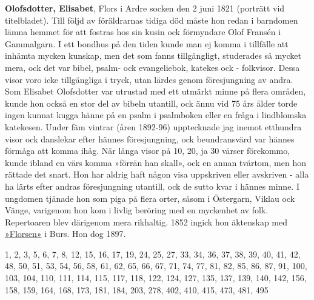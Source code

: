 \textbf{Olofsdotter, Elisabet}, Flors i Ardre socken den 2 juni 1821 (porträtt vid titelbladet).
Till följd av föräldrarnas tidiga död måste hon redan i barndomen lämna hemmet för att fostras hos sin kusin ock förmyndare Olof Fransén i Gammalgarn. I ett bondhus på den tiden kunde man ej komma i tillfälle att inhämta mycken kunskap, men det som fanns tillgängligt, studerades så mycket mera, ock det var bibel, psalm- ock evangeliebok, katekes ock - folkvisor. Dessa visor voro icke tillgängliga i tryck, utan lärdes genom föresjungning av andra. Som Elisabet Olofsdotter var utrustad med ett utmärkt minne på flera områden, kunde hon också en stor del av bibeln utantill, ock ännu vid 75 års ålder torde ingen kunnat kugga hänne på en psalm i psalmboken eller en fråga i lindblomska katekesen. Under fäm vintrar (åren 1892-96) upptecknade jag inemot etthundra visor ock danslekar efter hännes föresjungning, ock beundransvärd var hännes förmåga att komma ihåg. När långa visor på 10, 20, ja 30 värser förekommo, kunde ibland en värs komma »förrän han skall», ock en annan tvärtom, men hon rättade det snart. Hon har aldrig haft någon visa uppskriven eller avskriven - alla ha lärts efter andras föresjungning utantill, ock de sutto kvar i hännes minne. I ungdomen tjänade hon som piga på flera orter, såsom i Östergarn, Viklau ock Vänge, varigenom hon kom i livlig beröring med en myckenhet av folk. Repertoaren blev därigenom mera rikhaltig. 1852 ingick hon äktenskap med \href{Florsen}{»Florsen»} i Burs. Hon dog 1897. 

1, 2, 3, 5, 6, 7, 8, 12, 15, 16, 17, 19, 24, 25, 27, 33, 34, 36, 37, 38, 39, 40, 41, 42, 48, 50, 51, 53, 54, 56, 58, 61, 62, 65, 66, 67, 71, 74, 77, 81, 82, 85, 86, 87, 91, 100, 103, 104, 110, 111, 114, 115, 117, 118, 122, 124, 127, 135, 137, 139, 140, 142, 156, 158, 159, 164, 168, 173, 181, 184, 203, 278, 402, 410, 415, 473, 481, 495 

